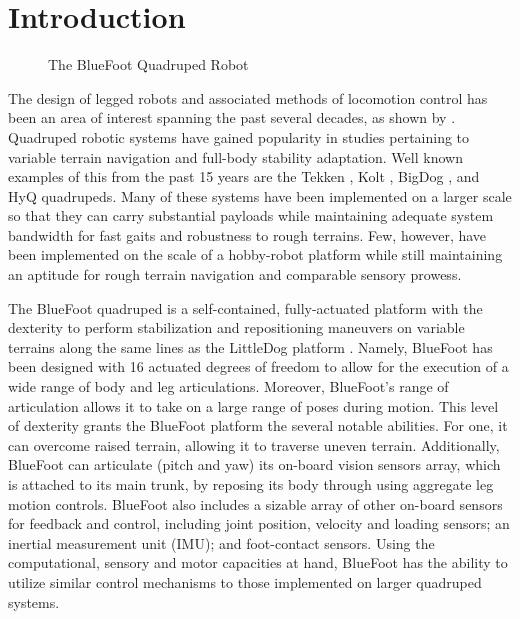 \chapter{Introduction}
	\label{ch::introduction}
	
	\begin{figure}[h!]
		\centering
		\caption{The BlueFoot Quadruped Robot}
		\label{fig::bluefoot_glamour}
	\end{figure}
		The design of legged robots and associated methods of locomotion control has been an area of interest spanning the past several decades, as shown by \cite{McGhee1965,Hodgins1991,Altendorfer2001,Kolter2008,Wieber2015}. Quadruped robotic systems have gained popularity in studies pertaining to variable terrain navigation and full-body stability adaptation. Well known examples of this from the past 15 years are the Tekken \cite{Fukuoka2003}, Kolt \cite{Estremera2006}, BigDog \cite{BigDog2008}, and HyQ \cite{Semini2010_PHD} quadrupeds. Many of these systems have been implemented on a larger scale so that they can carry substantial payloads while maintaining adequate system bandwidth for fast gaits and robustness to rough terrains. Few, however, have been implemented on the scale of a hobby-robot platform while still maintaining an aptitude for rough terrain navigation and comparable sensory prowess.

		The BlueFoot quadruped is a self-contained, fully-actuated platform with the dexterity to perform stabilization and repositioning maneuvers on variable terrains along the same lines as the LittleDog platform \cite{Rebula2007}. Namely, BlueFoot has been designed with 16 actuated degrees of freedom to allow for the execution of a wide range of body and leg articulations. Moreover, BlueFoot's range of articulation allows it to take on a large range of poses during motion. This level of dexterity grants the BlueFoot platform the several notable abilities. For one, it can overcome raised terrain, allowing it to traverse uneven terrain. Additionally, BlueFoot can articulate (\IE pitch and yaw) its on-board vision sensors array, which is attached to its main trunk, by reposing its body through using aggregate leg motion controls. BlueFoot also includes a sizable array of other on-board sensors for feedback and control, including joint position, velocity and loading sensors; an inertial measurement unit (IMU); and foot-contact sensors. Using the computational, sensory and motor capacities at hand, BlueFoot has the ability to utilize similar control mechanisms to those implemented on larger quadruped systems. 

